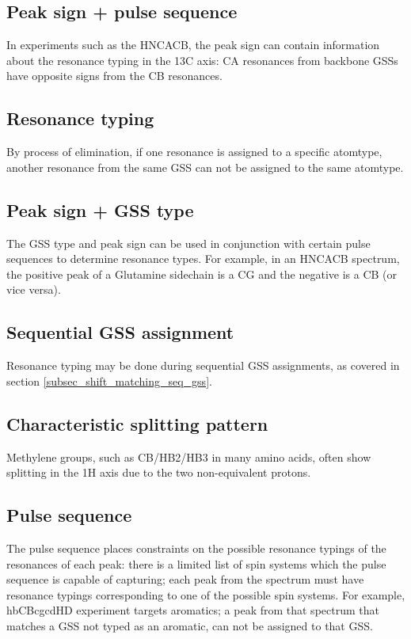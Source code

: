 \subsection*{Peak sign + pulse sequence}
In experiments such as the HNCACB, the peak sign can contain information 
about the resonance typing in the 13C axis: CA resonances from backbone
GSSs have opposite signs from the CB resonances.

\subsection*{Resonance typing}
By process of elimination, if one resonance is assigned to a specific atomtype,
another resonance from the same GSS can not be assigned to the same atomtype.

\subsection*{Peak sign + GSS type}
The GSS type and peak sign can be used in conjunction with certain pulse 
sequences to determine resonance types.  For example, in an HNCACB spectrum, 
the positive peak of a Glutamine sidechain is a CG and the negative is a CB 
(or vice versa).

\subsection*{Sequential GSS assignment}
Resonance typing may be done during sequential GSS assignments, as covered
in section \ref{subsec_shift_matching_seq_gss}.

\subsection*{Characteristic splitting pattern}
Methylene groups, such as CB/HB2/HB3 in many amino acids, often show 
splitting in the 1H axis due to the two non-equivalent protons.

\subsection*{Pulse sequence}
The pulse sequence places constraints on the possible resonance typings of the
resonances of each peak: there is a limited list of spin systems which the
pulse sequence is capable of capturing; each peak from the spectrum must have
resonance typings corresponding to one of the possible spin systems.
For example, hbCBcgcdHD experiment targets aromatics; a peak from that spectrum
that matches a GSS not typed as an aromatic, can not be assigned 
to that GSS.

